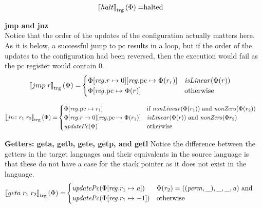\documentclass[a4paper]{article}
\newcommand{\sem}[1]{\left\llbracket #1 \right\rrbracket}
\newcommand{\tsem}[2][\Phi]{\sem{#2}_{\mathrm{trg}}(#1)}
\newcommand{\tand}{\text{ and }}
\newcommand{\totherwise}{\text{otherwise }}
\newcommand{\targetcolor}[1]{\color{black}}
\newcommand{\trg}[1]{{\targetcolor{} #1}}
\newcommand{\zinstr}[1]{#1}
\newcommand{\oneinstr}[2]{
  \ifthenelse{\equal{#2}{}}
  {\zinstr{#1}}
  {\zinstr{#1} \; #2}
}
\newcommand{\twoinstr}[3]{
  \ifthenelse{\equal{#2#3}{}}
  {\zinstr{#1}}
  {\zinstr{#1} \; #2 \; #3}
}
\newcommand{\thalt}{\zinstr{\trg{halt}}}
\newcommand{\tjmp}[1]{\oneinstr{\trg{jmp}}{#1}}
\newcommand{\tjnz}[2]{\twoinstr{\trg{jnz}}{#1}{#2}}
\newcommand{\tgeta}[2]{\twoinstr{\trg{geta}}{#1}{#2}}
\newcommand{\update}[2]{[#1 \mapsto #2]}
\newcommand{\updReg}[2]{\update{\reg.#1}{#2}}
\newcommand{\perm}{\var{perm}}
\newcommand{\halted}{\mathrm{halted}}
\newcommand{\var}[1]{\mathit{#1}}
\newcommand{\reg}{\var{reg}}
\newcommand{\aaddr}{\var{a}}
\newcommand{\pcreg}{\mathrm{pc}}
\newcommand{\plainfun}[2]{
  \ifthenelse{\equal{#2}{}}
  {\mathit{#1}}
  {\mathit{#1}(#2)}
}
\newcommand{\updPcAddr}[1]{\plainfun{updatePc}{#1}}
\newcommand{\nonLinear}[1]{\plainfun{nonLinear}{#1}}
\newcommand{\isLinear}[1]{\plainfun{isLinear}{#1}}
\newcommand{\nonZero}[1]{\plainfun{nonZero}{#1}}
\begin{document}
\begin{align*}
  \tsem{\thalt} = & \halted
\end{align*}

\textbf{jmp and jnz}\\
Notice that the order of the updates of the configuration actually matters here. As it is below, a successful jump to $\pcreg$ results in a loop, but if the order of the updates to the configuration had been reversed, then the execution would fail as the $\pcreg$ register would contain 0.
\begin{align*}
  \tsem{\tjmp{r}} = & 
                      \begin{cases}
                        \Phi\updReg{r}{0}\updReg{\pcreg}{\Phi(r_r)}
                             & \isLinear{\Phi(r)} \\
                        \Phi\updReg{\pcreg}{\Phi(r)} & \totherwise
                      \end{cases}
\end{align*}

\begin{align*}
  \tsem{\tjnz{r_1}{r_2}} = &       
                             \begin{cases}
                               \Phi\updReg{\pcreg}{r_1} & \text{if $\nonLinear{\Phi(r_1)}$ and $\nonZero{\Phi(r_2)}$} \\
                               \Phi\updReg{r}{0}\updReg{\pcreg}{\Phi(r_1)}
                                               & \arraycolsep=0pt                               
                                               \begin{array}[t]{l}
                                                 \isLinear{\Phi(r)} \tand
                                                 \nonZero{\Phi{r_2}}
                                               \end{array}
\\
                               \updPcAddr{\Phi} & \totherwise
                             \end{cases}
\end{align*}

\textbf{Getters: geta, getb, gete, getp, and getl}
Notice the difference between the getters in the target languages and their equivalents in the source language is that these do not have a case for the stack pointer as it does not exist in the language.
\begin{align*}
  \tsem{\tgeta{r_1}{r_2}} = &
                              \begin{cases}
                                \updPcAddr{\Phi\update{\reg.r_1}{\aaddr}} & 
                                \arraycolsep=0pt
                                \begin{array}[t]{l}
                                  \Phi(r_2) = ((\perm,\_),\_,\_,\aaddr) \tand \\
                                \end{array} \\
                                \updPcAddr{\Phi\updReg{r_1}{-1}} & \totherwise
                              \end{cases}
\end{align*}
\end{document}
